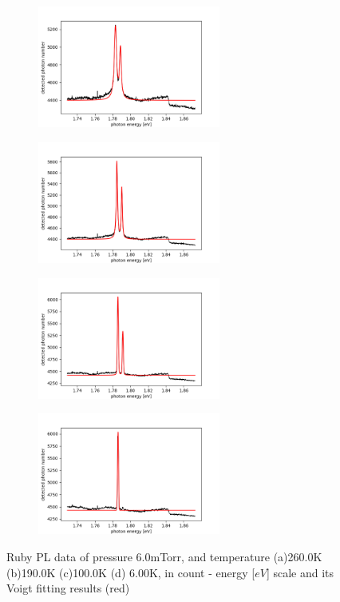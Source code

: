 \documentclass{article}
\begin{document}
 \begin{figure}[ht]
  \centering
  \begin{subfigure}[b]{6cm}
      \centering
      \includegraphics[width=6cm]{../results/Ruby(260.0)_voigt_fitted_fig.png}
      \caption{}
  \end{subfigure}
  \hfill
  \begin{subfigure}[b]{6cm}
      \centering
      \includegraphics[width=6cm]{../results/Ruby(190.0)_voigt_fitted_fig.png}
      \caption{}
  \end{subfigure}
  \hfill
  \begin{subfigure}[b]{6cm}
    \centering
    \includegraphics[width=6cm]{../results/Ruby(100.0)_voigt_fitted_fig.png}
    \caption{}
\end{subfigure}
\hfill
\begin{subfigure}[b]{6cm}
  \centering
  \includegraphics[width=6cm]{../results/Ruby(9.2)_voigt_fitted_fig.png}
  \caption{}
\end{subfigure}
\hfill
  \caption{Ruby PL data of pressure 6.0mTorr, and temperature (a)260.0K (b)190.0K (c)100.0K (d) 6.00K, in count - energy [$eV$] scale and its Voigt fitting results (red)}
  \label{fig: Ruby_fitted_data}
\end{figure}
\end{document}
